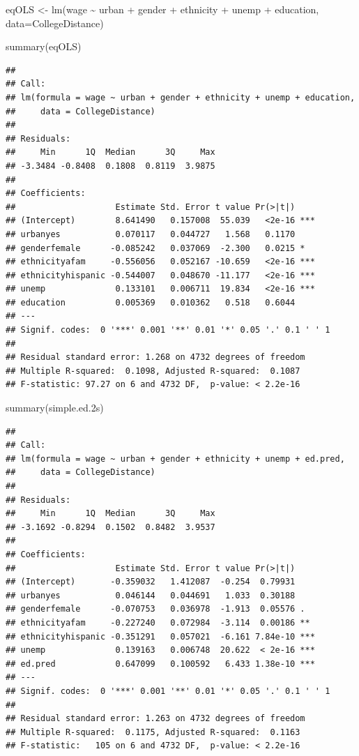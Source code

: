 \documentclass[
]{book}
\newenvironment{Shaded}{\begin{snugshade}}{\end{snugshade}}
\newcommand{\AttributeTok}[1]{\textcolor[rgb]{0.77,0.63,0.00}{#1}}
\newcommand{\FloatTok}[1]{\textcolor[rgb]{0.00,0.00,0.81}{#1}}
\newcommand{\FunctionTok}[1]{\textcolor[rgb]{0.00,0.00,0.00}{#1}}
\newcommand{\NormalTok}[1]{#1}
\newcommand{\OtherTok}[1]{\textcolor[rgb]{0.56,0.35,0.01}{#1}}
\newcommand{\SpecialCharTok}[1]{\textcolor[rgb]{0.00,0.00,0.00}{#1}}
\theoremstyle{definition}
\theoremstyle{definition}
\theoremstyle{definition}
\theoremstyle{definition}
\theoremstyle{remark}
\begin{document}
\begin{Shaded}
\begin{Highlighting}[]
\NormalTok{eqOLS }\OtherTok{\textless{}{-}} \FunctionTok{lm}\NormalTok{(wage }\SpecialCharTok{\textasciitilde{}}\NormalTok{ urban }\SpecialCharTok{+}\NormalTok{ gender }\SpecialCharTok{+}\NormalTok{ ethnicity }\SpecialCharTok{+}\NormalTok{ unemp }\SpecialCharTok{+}\NormalTok{ education,}
            \AttributeTok{data=}\NormalTok{CollegeDistance)}

\FunctionTok{summary}\NormalTok{(eqOLS)}
\end{Highlighting}
\end{Shaded}

\begin{verbatim}
## 
## Call:
## lm(formula = wage ~ urban + gender + ethnicity + unemp + education, 
##     data = CollegeDistance)
## 
## Residuals:
##     Min      1Q  Median      3Q     Max 
## -3.3484 -0.8408  0.1808  0.8119  3.9875 
## 
## Coefficients:
##                    Estimate Std. Error t value Pr(>|t|)    
## (Intercept)        8.641490   0.157008  55.039   <2e-16 ***
## urbanyes           0.070117   0.044727   1.568   0.1170    
## genderfemale      -0.085242   0.037069  -2.300   0.0215 *  
## ethnicityafam     -0.556056   0.052167 -10.659   <2e-16 ***
## ethnicityhispanic -0.544007   0.048670 -11.177   <2e-16 ***
## unemp              0.133101   0.006711  19.834   <2e-16 ***
## education          0.005369   0.010362   0.518   0.6044    
## ---
## Signif. codes:  0 '***' 0.001 '**' 0.01 '*' 0.05 '.' 0.1 ' ' 1
## 
## Residual standard error: 1.268 on 4732 degrees of freedom
## Multiple R-squared:  0.1098, Adjusted R-squared:  0.1087 
## F-statistic: 97.27 on 6 and 4732 DF,  p-value: < 2.2e-16
\end{verbatim}

\begin{Shaded}
\begin{Highlighting}[]
\FunctionTok{summary}\NormalTok{(simple.ed}\FloatTok{.2}\NormalTok{s)}
\end{Highlighting}
\end{Shaded}

\begin{verbatim}
## 
## Call:
## lm(formula = wage ~ urban + gender + ethnicity + unemp + ed.pred, 
##     data = CollegeDistance)
## 
## Residuals:
##     Min      1Q  Median      3Q     Max 
## -3.1692 -0.8294  0.1502  0.8482  3.9537 
## 
## Coefficients:
##                    Estimate Std. Error t value Pr(>|t|)    
## (Intercept)       -0.359032   1.412087  -0.254  0.79931    
## urbanyes           0.046144   0.044691   1.033  0.30188    
## genderfemale      -0.070753   0.036978  -1.913  0.05576 .  
## ethnicityafam     -0.227240   0.072984  -3.114  0.00186 ** 
## ethnicityhispanic -0.351291   0.057021  -6.161 7.84e-10 ***
## unemp              0.139163   0.006748  20.622  < 2e-16 ***
## ed.pred            0.647099   0.100592   6.433 1.38e-10 ***
## ---
## Signif. codes:  0 '***' 0.001 '**' 0.01 '*' 0.05 '.' 0.1 ' ' 1
## 
## Residual standard error: 1.263 on 4732 degrees of freedom
## Multiple R-squared:  0.1175, Adjusted R-squared:  0.1163 
## F-statistic:   105 on 6 and 4732 DF,  p-value: < 2.2e-16
\end{verbatim}
\end{document}
